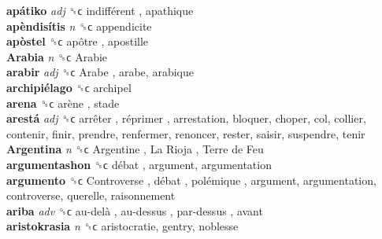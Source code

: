 \textbf{apátiko} \emph{adj}  ␝ϲ   indifférent , apathique  \\
\textbf{apèndisítis} \emph{n}  ␝ϲ  appendicite  \\
\textbf{apòstel} ␝ϲ   apôtre , apostille  \\
\textbf{Arabia} \emph{n}  ␝ϲ   Arabie   \\
\textbf{arabir} \emph{adj}  ␝ϲ   Arabe , arabe, arabique  \\
\textbf{archipiélago} ␝ϲ  archipel  \\
\textbf{arena} ␝ϲ   arène , stade  \\
\textbf{arestá} \emph{adj}  ␝ϲ   arrêter ,  réprimer , arrestation, bloquer, choper, col, collier, contenir, finir, prendre, renfermer, renoncer, rester, saisir, suspendre, tenir  \\
\textbf{Argentina} \emph{n}  ␝ϲ   Argentine ,  La Rioja ,  Terre de Feu   \\
\textbf{argumentashon} ␝ϲ   débat , argument, argumentation  \\
\textbf{argumento} ␝ϲ   Controverse ,  débat ,  polémique , argument, argumentation, controverse, querelle, raisonnement  \\
\textbf{ariba} \emph{adv}  ␝ϲ   au-delà ,  au-dessus ,  par-dessus , avant  \\
\textbf{aristokrasia} \emph{n}  ␝ϲ  aristocratie, gentry, noblesse  \\
